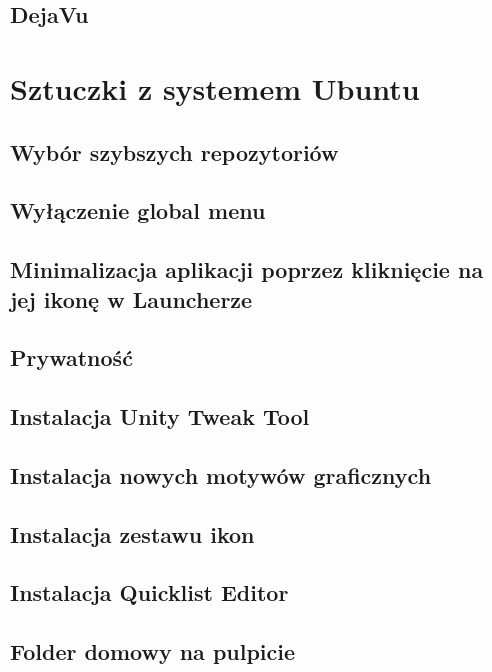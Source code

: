 \documentclass[a4paper,11pt,oneside]{mwart}
\begin{document}
        \subsection{DejaVu}
\section{Sztuczki z systemem Ubuntu}
		
		\subsection{Wybór szybszych repozytoriów}
			
		\subsection{Wyłączenie global menu}
			
		\subsection{Minimalizacja aplikacji poprzez kliknięcie na jej ikonę w Launcherze}
			
		\subsection{Prywatność}
			
        \subsection{Instalacja Unity Tweak Tool}
        		
        \subsection{Instalacja nowych motywów graficznych}
        		
        \subsection{Instalacja zestawu ikon}
        		
        	\subsection{Instalacja Quicklist Editor}
        		
        \subsection{Folder domowy na pulpicie}
        		        
\end{document}
